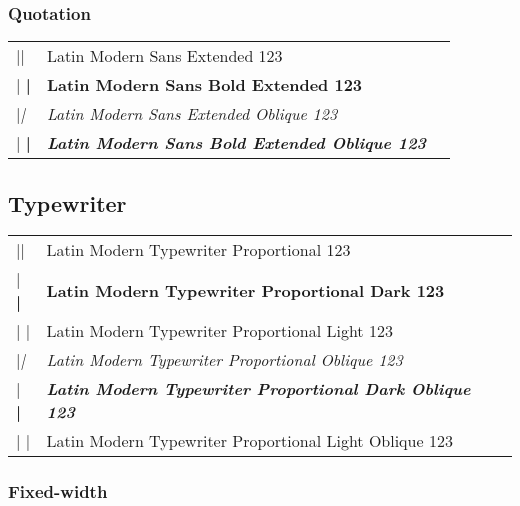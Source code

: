 \documentclass[a4paper]{article}
\makeatletter
\newenvironment{vrb}{\begin{tabular}{@{}p{5cm}ll@{}}}{\end{tabular}}
\makeatother
\begin{document}
\subsubsection*{Quotation}

\qtstyle
\begin{vrb}
|\qtstyle | & {Latin Modern Sans Extended 123} \\
|  \bfseries | & {\bfseries Latin Modern Sans Bold Extended 123} \\
|\slshape | & {\slshape Latin Modern Sans Extended Oblique 123} \\
|  \bfseries | & {\bfseries\slshape Latin Modern Sans Bold Extended Oblique 123} \\
\end{vrb}

\subsection*{Typewriter}

\ttfamily
\tvstyle
\begin{vrb}
|\ttfamily\tvstyle | & {Latin Modern Typewriter Proportional 123} \\
|  \bfseries | & {\bfseries Latin Modern Typewriter Proportional Dark 123} \\
|  \lgweight | & {\lgweight Latin Modern Typewriter Proportional Light 123} \\
|\slshape | & {\slshape Latin Modern Typewriter Proportional Oblique 123} \\
|  \bfseries | & {\bfseries\slshape Latin Modern Typewriter Proportional Dark Oblique 123} \\
|  \lgweight | & {\lgweight Latin Modern Typewriter Proportional Light Oblique 123} \\
\end{vrb}

\subsubsection*{Fixed-width}
\end{document}
